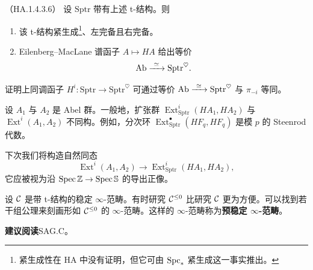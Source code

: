 \begin{proposition}\label{L16-5.2}（HA.1.4.3.6）
设 $\mathrm{Sptr}$ 带有上述 t-结构。则
\begin{enumerate}[label=(\arabic*),leftmargin=2.4em,itemsep=0.1em]
\item 该 t-结构紧生成\footnote{紧生成性在 HA 中没有证明，但它可由 $\operatorname{Spc}_*$ 紧生成这一事实推出。}、左完备且右完备。
\item Eilenberg–MacLane 谱函子 $A\mapsto HA$ 给出等价
\[
\Ab\xrightarrow{\ \simeq\ }\mathrm{Sptr}^{\heartsuit}.
\]
\end{enumerate}
\end{proposition}

\begin{exercise}\label{L16-5.3}
证明上同调函子 $H^i\colon\mathrm{Sptr}\to\mathrm{Sptr}^{\heartsuit}$ 可通过等价 $\Ab\xrightarrow{\ \simeq\ }\mathrm{Sptr}^{\heartsuit}$ 与 $\pi_{-i}$ 等同。
\end{exercise}

\begin{warning}\label{L16-5.4}
设 $A_1$ 与 $A_2$ 是 Abel 群。一般地，扩张群 $\operatorname{Ext}^i_{\mathrm{Sptr}}(HA_1,HA_2)$ 与 $\operatorname{Ext}^i(A_1,A_2)$ 不同构。例如，分次环 $\operatorname{Ext}^{\bullet}_{\mathrm{Sptr}}(HF_q,HF_q)$ 是模 $p$ 的 Steenrod 代数。
\end{warning}

\nitem\label{L16-5.5} 下次我们将构造自然同态
\[
\operatorname{Ext}^i(A_1,A_2)\to\operatorname{Ext}^i_{\mathrm{Sptr}}(HA_1,HA_2),
\]
它应被视为沿 $\operatorname{Spec}\mathbb{Z}\to\operatorname{Spec}\mathbb{S}$ 的导出正像。


\nitem\label{L16-A.1} 设 $\mathcal{C}$ 是带 t-结构的稳定 $\infty$-范畴。有时研究 $\mathcal{C}^{\le0}$ 比研究 $\mathcal{C}$ 更为方便。可以找到若干组公理来刻画形如 $\mathcal{C}^{\le0}$ 的 $\infty$-范畴。这样的 $\infty$-范畴称为\textbf{预稳定 $\infty$-范畴}。

\nitem\label{L16-A.2} \textbf{建议阅读}\quad SAG.C。

